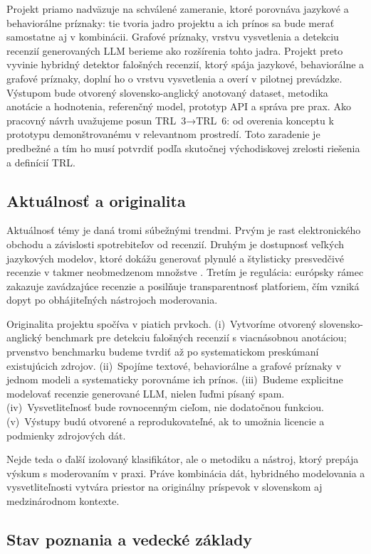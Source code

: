 \documentclass[11pt,a4paper]{article}
\begin{document}
Projekt priamo nadväzuje na schválené zameranie, ktoré porovnáva jazykové a behaviorálne príznaky: tie tvoria jadro projektu a ich prínos sa bude merať samostatne aj v kombinácii. Grafové príznaky, vrstvu vysvetlenia a detekciu recenzií generovaných LLM berieme ako rozšírenia tohto jadra. Projekt preto vyvinie hybridný detektor falošných recenzií, ktorý spája jazykové, behaviorálne a grafové príznaky, doplní ho o vrstvu vysvetlenia a overí v pilotnej prevádzke. Výstupom bude otvorený slovensko-anglický anotovaný dataset, metodika anotácie a hodnotenia, referenčný model, prototyp API a správa pre prax. Ako pracovný návrh uvažujeme posun TRL~3→TRL~6: od overenia konceptu k prototypu demonštrovanému v relevantnom prostredí. Toto zaradenie je predbežné a tím ho musí potvrdiť podľa skutočnej východiskovej zrelosti riešenia a definícií TRL.

\subsection{Aktuálnosť a originalita}

Aktuálnosť témy je daná tromi súbežnými trendmi. Prvým je rast elektronického obchodu a závislosti spotrebiteľov od recenzií. Druhým je dostupnosť veľkých jazykových modelov, ktoré dokážu generovať plynulé a štylisticky presvedčivé recenzie v takmer neobmedzenom množstve \cite{zhao2025}. Tretím je regulácia: európsky rámec zakazuje zavádzajúce recenzie a posilňuje transparentnosť platforiem, čím vzniká dopyt po obhájiteľných nástrojoch moderovania.

Originalita projektu spočíva v piatich prvkoch. (i)~Vytvoríme otvorený slovensko-anglický benchmark pre detekciu falošných recenzií s viacnásobnou anotáciou; prvenstvo benchmarku budeme tvrdiť až po systematickom preskúmaní existujúcich zdrojov. (ii)~Spojíme textové, behaviorálne a grafové príznaky v jednom modeli a systematicky porovnáme ich prínos. (iii)~Budeme explicitne modelovať recenzie generované LLM, nielen ľuďmi písaný spam. (iv)~Vysvetliteľnosť bude rovnocenným cieľom, nie dodatočnou funkciou. (v)~Výstupy budú otvorené a reprodukovateľné, ak to umožnia licencie a podmienky zdrojových dát.

Nejde teda o ďalší izolovaný klasifikátor, ale o metodiku a nástroj, ktorý prepája výskum s moderovaním v praxi. Práve kombinácia dát, hybridného modelovania a vysvetliteľnosti vytvára priestor na originálny príspevok v slovenskom aj medzinárodnom kontexte.

\subsection{Stav poznania a vedecké základy}
\end{document}
